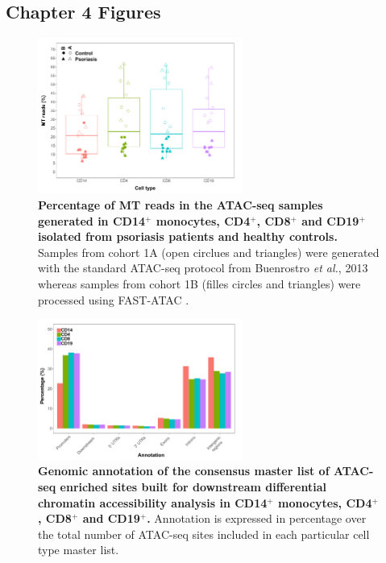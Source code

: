 \subsection{Chapter 4 Figures}

\begin{figure}[htbp]
\centering
\includegraphics[width=0.6\textwidth]{./Appendix/pdfs/Chapter4/ATAC_PS_CTL_MT_percent_boxplot}
\caption[Percentage of MT reads in the ATAC-seq libraries generated in CD14$^+$ monocytes, CD4$^+$, CD8$^+$ and CD19$^+$ isolated from psoriasis patients and healthy controls.]{\textbf{Percentage of MT reads in the ATAC-seq samples generated in CD14$^+$ monocytes, CD4$^+$, CD8$^+$ and CD19$^+$ isolated from psoriasis patients and healthy controls.} Samples from cohort 1A (open circlues and triangles) were generated with the standard ATAC-seq protocol from Buenrostro \textit{et al.}, 2013 whereas samples from cohort 1B (filles circles and triangles) were processed using FAST-ATAC \parencite{Corces2016}.}
\label{fig:ATAC_PS_CTL_MT_percent}
\end{figure}


\begin{figure}[htbp]
\centering
\includegraphics[width=0.6\textwidth]{./Appendix/pdfs/Chapter4/ATAC_all_cell_types_individual_master_lists_general_peak_annotation}
\caption[Genomic annotation of the consensus master list of ATAC-seq enriched sites built for downstream differential chromatin accessibility analysis in CD14$^+$ monocytes, CD4$^+$, CD8$^+$ and CD19$^+$.]{\textbf{Genomic annotation of the consensus master list of ATAC-seq enriched sites built for downstream differential chromatin accessibility analysis in CD14$^+$ monocytes, CD4$^+$, CD8$^+$ and CD19$^+$.} Annotation is expressed in percentage over the total number of ATAC-seq sites included in each particular cell type master list.}
\label{fig:ATAC_PS_CTL_genomic_annotation}
\end{figure}


